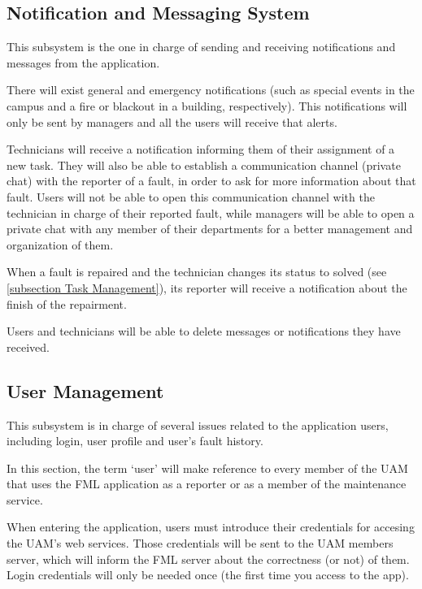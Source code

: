 \subsection{Notification and Messaging System}
\label{subsection Notification and Messaging System}
This subsystem is the one in charge of sending and receiving notifications and messages from the application.

There will exist general and emergency notifications (such as special events in the campus and a fire or blackout in a building, respectively). This notifications will only be sent by managers and all the users will receive that alerts.

Technicians will receive a notification informing them of their assignment of a new task. They will also be able to establish a communication channel (private chat) with the reporter of a fault, in order to ask for more information about that fault. Users will not be able to open this communication channel with the technician in charge of their reported fault, while managers will be able to open a private chat with any member of their departments for a better management and organization of them.

When a fault is repaired and the technician changes its status to solved (see \ref{subsection Task Management}), its reporter will receive a notification about the finish of the repairment.

Users and technicians will be able to delete messages or notifications they have received.

\subsection{User Management}
\label{subsection User Management}

This subsystem is in charge of several issues related to the application users, including login, user profile and user's fault history.

In this section, the term `user' will make reference to every member of the UAM that uses the FML application as a reporter or as a member of the maintenance service.

When entering the application, users must introduce their credentials for accesing the UAM's web services. Those credentials will be sent to the UAM members server, which will inform the FML server about the correctness (or not) of them. Login credentials will only be needed once (the first time you access to the app).

